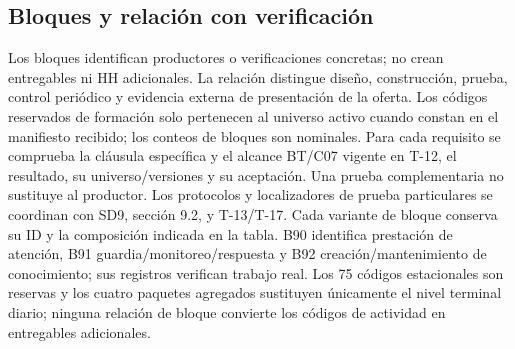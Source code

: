\subsection{Bloques y relación con verificación}
Los bloques identifican productores o verificaciones concretas; no crean entregables ni HH adicionales. La relación distingue diseño, construcción, prueba, control periódico y evidencia externa de presentación de la oferta. Los códigos reservados de formación solo pertenecen al universo activo cuando constan en el manifiesto recibido; los conteos de bloques son nominales. Para cada requisito se comprueba la cláusula específica y el alcance BT/C07 vigente en T-12, el resultado, su universo/versiones y su aceptación. Una prueba complementaria no sustituye al productor. Los protocolos y localizadores de prueba particulares se coordinan con SD9, sección 9.2, y T-13/T-17. Cada variante de bloque conserva su ID y la composición indicada en la tabla. B90 identifica prestación de atención, B91 guardia/monitoreo/respuesta y B92 creación/mantenimiento de conocimiento; sus registros verifican trabajo real. Los 75 códigos estacionales son reservas y los cuatro paquetes agregados sustituyen únicamente el nivel terminal diario; ninguna relación de bloque convierte los códigos de actividad en entregables adicionales.
\begingroup\setlength{\tabcolsep}{3pt}

